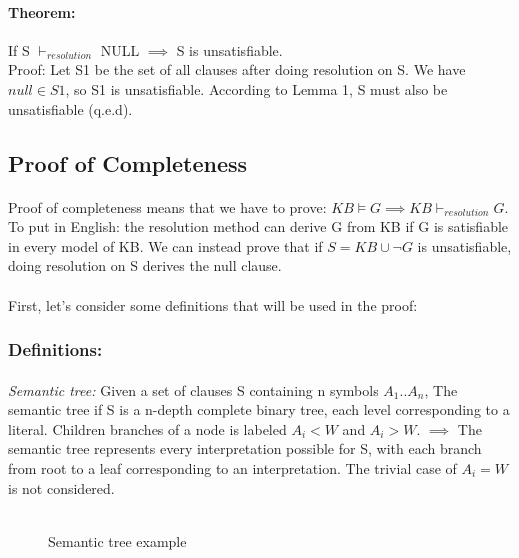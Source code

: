 \documentclass[part1.tex]{subfiles}
\begin{document}
\paragraph{Theorem:} If S \(\vdash_{resolution}\) NULL \(\implies\) S is unsatisfiable.\\
\indent Proof: Let S1 be the set of all clauses after doing resolution on S. We have \(null \in S1\), so
S1 is unsatisfiable. According to Lemma 1, S must also be unsatisfiable (q.e.d).\\
\subsection{Proof of Completeness}
\paragraph{} Proof of completeness means that we have to prove: \(KB \models G \implies KB {\vdash}_{resolution} G\). To put in English: the resolution method can derive G from KB if G is satisfiable in every model of 
KB. We can instead prove that if \(S = KB \cup \neg G\) is unsatisfiable,  doing resolution on
S derives the null clause.\\
\paragraph{} First, let's consider some definitions that will be
used in the proof:
\subsubsection{Definitions:}
\paragraph{}{\em Semantic tree:} Given a set of clauses S
containing n symbols \(A_1..A_n\), The semantic
tree if S is a n-depth complete binary tree, each level corresponding to a literal. Children branches
of a node is labeled \(A_i < W\) and \(A_i > W\). 
\(\implies\) The semantic tree represents every interpretation possible for S, with each branch from
root to a leaf corresponding to an interpretation. The trivial case of \(A_i = W\) is not considered.\\\\
\begin{figure}[h]
        \centering
{}
\caption{Semantic tree example}
\end{figure}
\\
\end{document}
